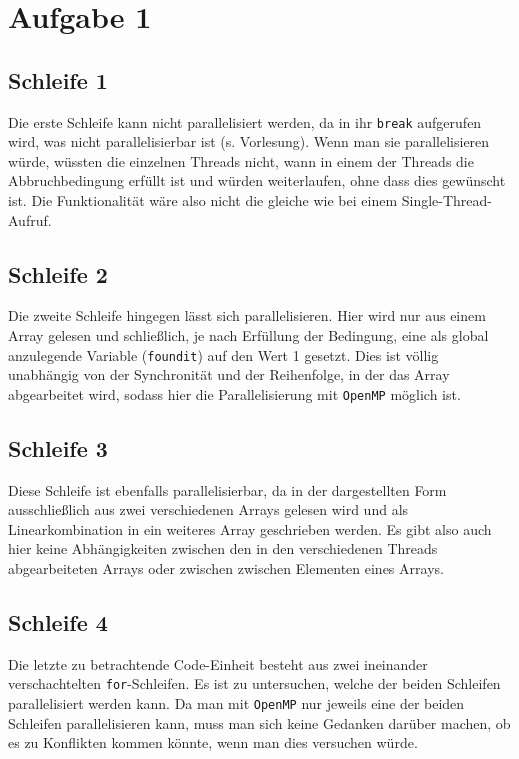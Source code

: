 \section*{Aufgabe 1}
\subsection*{Schleife 1}

Die erste Schleife kann nicht parallelisiert werden, da in ihr \texttt{break}
aufgerufen wird, was nicht parallelisierbar ist (s. Vorlesung). Wenn man sie parallelisieren
würde, wüssten die einzelnen Threads nicht, wann in einem der Threads die Abbruchbedingung 
erfüllt ist und würden weiterlaufen, ohne dass dies gewünscht ist. Die Funktionalität
wäre also nicht die gleiche wie bei einem Single-Thread-Aufruf.

\subsection*{Schleife 2}

Die zweite Schleife hingegen lässt sich parallelisieren. Hier wird nur aus einem
Array gelesen und schließlich, je nach Erfüllung der Bedingung, eine als global
anzulegende Variable (\texttt{foundit}) auf den Wert 1 gesetzt. Dies ist völlig
unabhängig von der Synchronität und der Reihenfolge, in der das Array
abgearbeitet wird, sodass hier die Parallelisierung mit \texttt{OpenMP} möglich ist.

\subsection*{Schleife 3}

Diese Schleife ist ebenfalls parallelisierbar, da in der dargestellten Form ausschließlich
aus zwei verschiedenen Arrays gelesen wird und als Linearkombination in ein weiteres
Array geschrieben werden. Es gibt also auch hier keine Abhängigkeiten zwischen
den in den verschiedenen Threads abgearbeiteten Arrays oder zwischen zwischen Elementen
eines Arrays.

\subsection*{Schleife 4}

Die letzte zu betrachtende Code-Einheit besteht aus zwei ineinander verschachtelten
\texttt{for}-Schleifen. Es ist zu untersuchen, welche der beiden Schleifen parallelisiert
werden kann. Da man mit \texttt{OpenMP} nur jeweils eine der beiden Schleifen parallelisieren
kann, muss man sich keine Gedanken darüber machen, ob es zu Konflikten kommen könnte,
wenn man dies versuchen würde.

